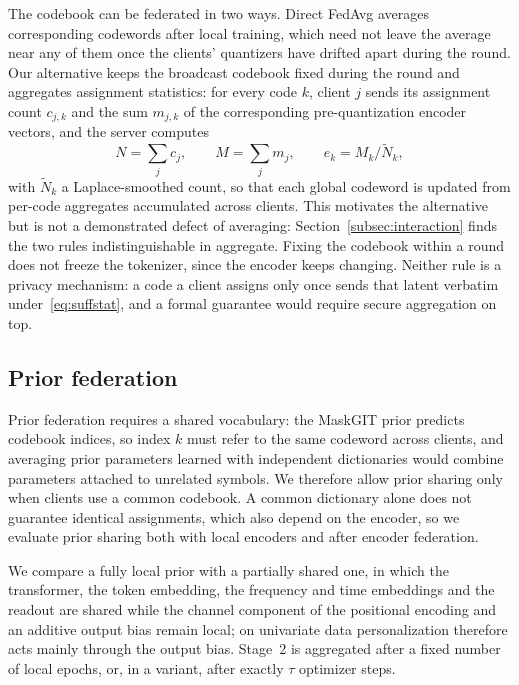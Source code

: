 \documentclass[conference]{IEEEtran}
\begin{document}
The codebook can be federated in two ways. Direct FedAvg averages corresponding codewords after
local training, which need not leave the average near any of them once the clients' quantizers have
drifted apart during the round. Our alternative keeps the broadcast codebook fixed during the round
and aggregates assignment statistics: for every code $k$, client $j$ sends its assignment count
$c_{j,k}$ and the sum $m_{j,k}$ of the corresponding pre-quantization encoder vectors, and the
server computes
\begin{equation}
    N = \sum_j c_j, \qquad
    M = \sum_j m_j, \qquad
    e_k = M_k / \tilde{N}_k,
    \label{eq:suffstat}
\end{equation}
with $\tilde{N}_k$ a Laplace-smoothed count, so that each global codeword is updated from per-code
aggregates accumulated across clients. This motivates the
alternative but is not a demonstrated defect of averaging: Section~\ref{subsec:interaction} finds
the two rules indistinguishable in aggregate. Fixing the codebook within a round does not freeze the
tokenizer, since the encoder keeps changing. Neither rule is a privacy mechanism: a code a client
assigns only once sends that latent verbatim under~\eqref{eq:suffstat}, and a formal guarantee
would require secure aggregation on top.

\subsection{Prior federation}
\label{subsec:coupling}

Prior federation requires a shared vocabulary: the MaskGIT prior predicts codebook indices, so index
$k$ must refer to the same codeword across clients, and averaging prior parameters learned with
independent dictionaries would combine parameters attached to unrelated symbols. We therefore allow
prior sharing only when clients use a common codebook. A common dictionary alone does not guarantee
identical assignments, which also depend on the encoder, so we evaluate prior sharing both with
local encoders and after encoder federation.

We compare a fully local prior with a partially shared one, in which the transformer, the token
embedding, the frequency and time embeddings and the readout are shared while the channel component
of the positional encoding and an additive output bias remain local; on univariate data
personalization therefore acts mainly through the output bias. Stage~2 is aggregated after a fixed
number of local epochs, or, in a variant, after exactly $\tau$ optimizer steps.
\end{document}
